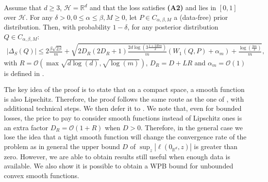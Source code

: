 \begin{theorem}
\label{th: main_gaussian_smooth}
Assume that $d\geq 3$, $\mathcal{H}= \mathbb{R}^d$ and that the loss satisfies \textbf{(A2)} and lies in $[0,1]$ over $\mathcal{H}$. For any $\delta>0, 0\leq \alpha\leq \beta, M\geq 0$, let $P\in C_{\alpha,\beta,M}$ a (data-free) prior distribution. Then, with probability $1-\delta$, for any posterior distribution $Q\in C_{\alpha,\beta,M}$:
\begin{align*}
|\Delta_S(Q)| \leq 2 \frac{\beta\sqrt{2\beta}}{m} + \sqrt{2D_R(2D_R+1)\frac{2d\log\left(3\frac{1 +2Rm }{\delta}\right)}{m} \left(W_1(Q,P)+ \alpha_m \right) + \frac{\log\left( \frac{3m}{\delta} \right)}{m} },
\end{align*}
with $R= \mathcal{O}\left( \max \sqrt{d\log(d)}, \sqrt{\log(m)}   \right)$,  $D_R= D+LR$ and $\alpha_m= \mathcal{O}(1)$ is defined in .
\end{theorem}
The key idea of the proof is to state that on a compact space, a smooth function is also Lipschitz. Therefore, the proof follows the same route as the one of , with additional technical steps. We then defer it to .
We note that, even for bounded losses, the price to pay to consider smooth functions instead of Lipschitz ones is an extra factor $D_R= \mathcal{O}(1+R)$ when $D>0$. Therefore, in the general case we lose the idea that a tight smooth function will change the convergence rate of the problem as in general the upper bound $D$ of  $\sup_{z}|\ell(0_{\mathbb{R}^d},z)|$ is greater than zero. However, we are able to obtain results still useful when enough data is available. We also show it is possible to obtain a WPB bound for unbounded convex smooth functions.

